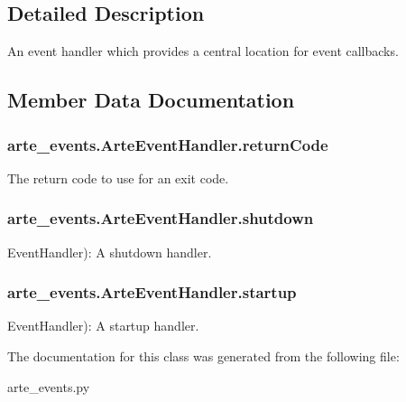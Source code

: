 \subsection{Detailed Description}
An event handler which provides a central location for event callbacks. 

\subsection{Member Data Documentation}
\subsubsection[{return\+Code}]{\setlength{\rightskip}{0pt plus 5cm}arte\+\_\+events.\+Arte\+Event\+Handler.\+return\+Code}\label{classarte__events_1_1_arte_event_handler_a0f2b65658b2c24816140c085d2f749d0}


The return code to use for an exit code. 

\subsubsection[{shutdown}]{\setlength{\rightskip}{0pt plus 5cm}arte\+\_\+events.\+Arte\+Event\+Handler.\+shutdown}\label{classarte__events_1_1_arte_event_handler_a4279bcd17863d20613c8fa861f882845}


Event\+Handler)\+: A shutdown handler. 

\subsubsection[{startup}]{\setlength{\rightskip}{0pt plus 5cm}arte\+\_\+events.\+Arte\+Event\+Handler.\+startup}\label{classarte__events_1_1_arte_event_handler_a05bee1005609e7a70c28962b7baed13f}


Event\+Handler)\+: A startup handler. 



The documentation for this class was generated from the following file\+:\begin{DoxyCompactItemize}
\item 
arte\+\_\+events.\+py\end{DoxyCompactItemize}
